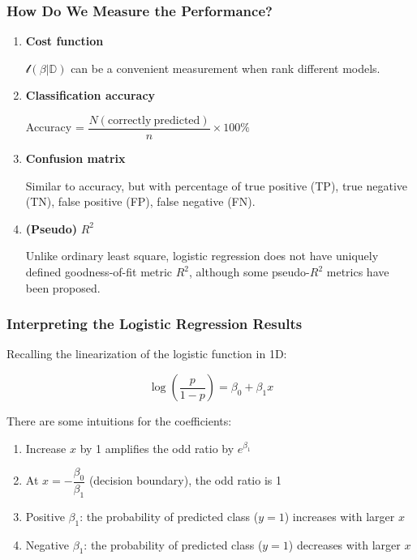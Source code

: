 \documentclass[10pt,aspectratio=169]{beamer}
\begin{document}
      \begin{frame}
        \frametitle{How Do We Measure the Performance?}
        \begin{enumerate}
          \vfill \item \textbf{Cost function}
          
          $\mathscr{l}(\beta | \mathbb{D})$ can be a convenient
          measurement when rank different models.
          
          \vfill \item \textbf{Classification accuracy}
          
          Accuracy =
          $\dfrac{N(\mathrm{correctly\ predicted})}{n} \times 100\%$
          
          \vfill \item \textbf{Confusion matrix}

          Similar to accuracy, but with percentage of true positive
          (TP), true negative (TN), false positive (FP), false
          negative (FN).
          
          \vfill \item \textbf{(Pseudo)} $R^{2}$

          Unlike ordinary least square, logistic regression does not
          have uniquely defined goodness-of-fit metric $R^{2}$, although some pseudo-$R^{2}$
          metrics have been proposed.%
          \let\thefootnote\relax{}
        \end{enumerate}
        
      \end{frame}

      \begin{frame}
        \frametitle{Interpreting the Logistic Regression Results}
        Recalling the linearization of the logistic function in 1D:

        \begin{equation*}
          \log \left(\frac{p}{1 - p}\right) = \beta_{0} + \beta_{1}x
        \end{equation*}

        There are some intuitions for the coefficients:
        \begin{enumerate}
          \vfill \item Increase $x$ by 1 amplifies the odd ratio by
          $e^{\beta_{1}}$ \vfill \item At
          $x = - \dfrac{\beta_{0}}{\beta_{1}}$ (decision boundary),
          the odd ratio is 1 \vfill \item Positive $\beta_{1}$: the
          probability of predicted class ($y=1$) increases with larger
          $x$ \vfill \item Negative $\beta_{1}$: the probability of
          predicted class ($y=1$) decreases with larger $x$
        \end{enumerate}
      \end{frame}
\end{document}

